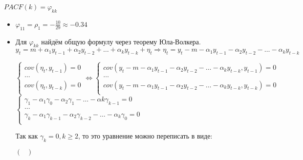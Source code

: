 \documentclass[10pt]{article}
\begin{document}
\begin{enumerate}
\begin{enumerate}
    $PACF(k) = \varphi_{kk}$
    \begin{itemize}
        \item $\varphi_{11} = \rho_1 = -\frac{10}{29}\approx -0.34$
        \item Для $\varphi_{kk}$ найдём общую формулу через теорему Юла-Волкера. \\
        $y_t = m + \alpha_1 y_{t-1} + \alpha_2 y_{t-2} + \hdots + \alpha_k y_{t-k} + \eta_t \Rightarrow \eta_t = y_t - m - \alpha_1 y_{t-1} - \alpha_2 y_{t-2} - \hdots - \alpha_k y_{t-k}$
        \begin{center}
            \begin{math}
                \begin{cases}
                    cov(\eta_t, y_{t-1}) = 0 \\
                    \hdots \\
                    cov(\eta_t, y_{t-k}) = 0 \\
                \end{cases}
                \Leftrightarrow
                \begin{cases}
                    cov(y_t - m - \alpha_1 y_{t-1} - \alpha_2 y_{t-2} - \hdots - \alpha_k y_{t-k}, y_{t-1}) = 0 \\
                    \hdots \\
                    cov(y_t - m - \alpha_1 y_{t-1} - \alpha_2 y_{t-2} - \hdots - \alpha_k y_{t-k}, y_{t-k}) = 0 \\
                \end{cases}
            \end{math}
            \begin{math}
                \begin{cases}
                    \gamma_1 - \alpha_1\gamma_0 - \alpha_2\gamma_1 - \hdots - \alpha{k}\gamma_{k-1} = 0 \\
                    \hdots \\
                    \gamma_k - \alpha_1\gamma_{k-1} - \alpha_2\gamma_{k-2} - \hdots - \alpha_k\gamma_0 = 0 \\
                \end{cases}
            \end{math}
        \end{center}
        Так как $\gamma_k = 0, k \geq 2$, то это уравнение можно переписать в виде:
        \begin{center}
            \begin{math}
                \begin{pmatrix}

\end{pmatrix}
\end{math}
\end{center}
\end{itemize}
\end{enumerate}
\end{enumerate}
\end{document}
